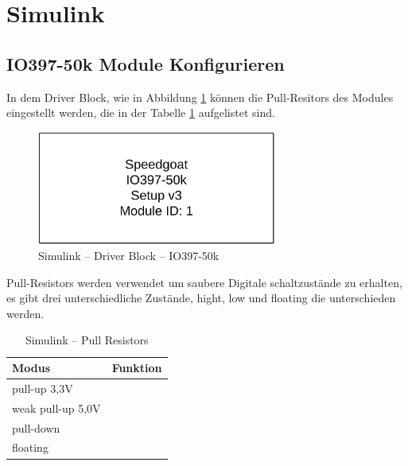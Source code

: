 \newpage
\section{Simulink}
\label{section:Simulink}



\subsection{IO397-50k Module Konfigurieren}
\label{Simulink:IO397_50k_Konfigurieren}
In dem Driver Block, wie in Abbildung \ref{IO397_50k_Konfigurieren:img:Driver_Block} können die Pull-Resitors des Modules eingestellt werden, die in der Tabelle \ref{IO397_50k_Konfigurieren:tab:Pull_Resistors} aufgelistet sind.

\pagebreak[1]
\begin{figure}[!ht]
	\begin{center}
		\includegraphics[width=0.7\textwidth]{img/4_simulink/IO397_50k.png}
		\caption{Simulink – Driver Block – IO397-50k}
		\label{IO397_50k_Konfigurieren:img:Driver_Block}
	\end{center}
\end{figure}
\pagebreak[1]

Pull-Resistors werden verwendet um saubere Digitale schaltzustände zu erhalten, es gibt drei unterschiedliche Zustände, hight, low und floating die unterschieden werden.

\pagebreak[1]
\begin{table}[!ht]
	\centering
	\caption{Simulink – Pull Resistors}
	\label{IO397_50k_Konfigurieren:tab:Pull_Resistors}
	\begin{tabular}{ll}
		\hline
		\textbf{Modus}                         & \textbf{Funktion} \\ \hline
		\multicolumn{1}{l|}{pull-up 3,3V}      &                   \\
		\multicolumn{1}{l|}{weak pull-up 5,0V} &                   \\
		\multicolumn{1}{l|}{pull-down}         &                   \\
		\multicolumn{1}{l|}{floating}          &                   \\ \hline
	\end{tabular}
\end{table}
\pagebreak[1]

